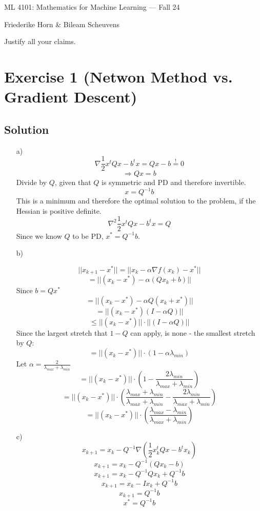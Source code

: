 \documentclass[10pt]{article}
\numberwithin{equation}{section}
\begin{document}
\begin{center}
    \sc ML 4101: Mathematics for Machine Learning --- Fall 24
\end{center}

\noindent Friederike Horn \& Bileam Scheuvens

Justify all your claims.
\section*{Exercise 1 (Netwon Method vs. Gradient Descent)}

\subsection*{Solution}

\begin{enumerate}
\item[a)]{
    $$\nabla \frac{1}{2} x^t Qx - b^t x = Qx - b \overset{!}{=} 0$$
    $$ \Rightarrow Qx = b$$
    Divide by $Q$, given that $Q$ is symmetric and PD and therefore invertible.
    $$ x = Q^{-1}b$$
    This is a minimum and therefore the optimal solution to the problem, if the Hessian is positive definite.
    $$\nabla^2 \frac{1}{2} x^t Qx - b^t x = Q$$
    Since we know $Q$ to be PD, $x^* = Q^{-1}b$.
  }

\item[b)] {
    $$||x_{k+1} - x^*|| = ||x_k - \alpha \nabla f(x_k) - x^* ||$$
    $$ = ||(x_k - x^*)  - \alpha (Qx_k + b) ||$$
    Since $b = Qx^*$
    $$= ||(x_k - x^*) - \alpha Q (x_k + x^*) ||$$
    $$= ||(x_k - x^*) (I - \alpha Q)  ||$$
$$\leq ||(x_k - x^*)||\cdot ||(I - \alpha Q)  ||$$
Since the largest stretch that $1-Q$ can apply, is none - the smallest stretch by $Q$: 
$$= ||(x_k - x^*)||\cdot (1-\alpha \lambda_{min})$$
    Let $\alpha = \frac{2}{\lambda_{max} + \lambda_{min}}$
    $$= ||(x_k - x^*)||\cdot (1 - \frac{2\lambda_{min}}{\lambda_{max} + \lambda_{min}})$$
    $$= ||(x_k - x^*)||\cdot (\frac{\lambda_{max} + \lambda_{min}}{\lambda_{max} + \lambda_{min}} - \frac{2\lambda_{min}}{\lambda_{max} + \lambda_{min}})$$
$$= ||(x_k - x^*)||\cdot \left(\frac{\lambda_{max} - \lambda_{min}}{\lambda_{max} + \lambda_{min}}\right)$$

  }
\item[c)] {
    $$x_{k+1} = x_k - Q^{-1}\nabla (\frac{1}{2} x_k^t Qx - b^t x_k)$$
  $$x_{k+1} = x_k - Q^{-1}(Qx_k - b)$$
  $$x_{k+1} = x_k - Q^{-1}Qx_k + Q^{-1}b$$
  $$x_{k+1} = x_k - Ix_k + Q^{-1}b$$
  $$x_{k+1} = Q^{-1}b$$
  $$x^* = Q^{-1}b$$
}
\end{enumerate}
\end{document}
